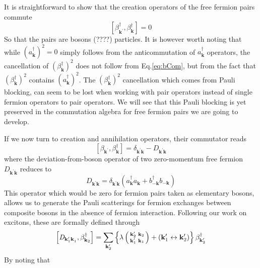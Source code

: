 \documentclass[aps,prb,superscriptaddress,showpacs,reprint,lengthcheck]{revtex4-1}
\newcommand{\vk}{\ensuremath{\mathbf{k}}}
\begin{document}
It is straightforward to show that the creation operators of the free fermion pairs commute 
\begin{equation}  \label{eq:bCom}
\left[\beta^{\dagger}_{\mathbf{k} ^{\prime}},\beta^{\dagger}_{\mathbf{k} }%
\right]  =0
\end{equation}
So that the pairs are bosons (????)  particles.  It is however worth noting that while ${(a^{\dagger}_{\mathbf{k}})} ^2=0$
simply follows from the anticommutation of $a^{\dagger}_{\mathbf{k} }$
operators, the cancellation of ${(\beta^{\dagger}_{\mathbf{k}})} ^2$ does not follow from Eq.\eqref{eq:bCom}, but from the fact that ${(\beta^{\dagger}_{\mathbf{k}})} ^2$  contains ${(a^{\dagger}_{\mathbf{k}})} ^2$. The ${(\beta^{\dagger}_{\mathbf{k}})} ^2$  cancellation which comes from Pauli blocking, can seem to be lost
when working with pair operators instead of  single fermion operators to pair operators. We will see that this Pauli blocking is yet preserved in the commutation algebra for
free fermion pairs we are going to develop.

If we now turn to creation and annihilation operators, their commutator reads
\begin{equation}  \label{eq:betacom}
\left[\beta_{\mathbf{k} ^{\prime}},\beta^{\dagger}_{\mathbf{k} }\right] 
=\delta_{\mathbf{k} ^{\prime}\mathbf{k} }-\mathit{D} _{\mathbf{k} ^{\prime}%
\mathbf{k} }
\end{equation}
where the deviation-from-boson operator of two zero-momentum free fermion $\mathit{D} _{\mathbf{k} ^{\prime}\mathbf{k%
} }$ reduces to 
\begin{equation}  \label{eq:D}
\mathit{D} _{\mathbf{k} ^{\prime}\mathbf{k} }=\delta_{\mathbf{k} ^{\prime}%
\mathbf{k} }\left(a^{\dagger}_{\mathbf{k}}a^{}_{\mathbf{k}
}+b^{\dagger}_{-\mathbf{k} }b^{}_{-\mathbf{k}
}\right) 
\end{equation}
This operator which would be  zero for fermion pairs  taken as
elementary bosons, allows us to generate the Pauli scatterings for fermion
exchanges between composite bosons in the absence of fermion interaction. Following our work on excitons\cite%
{CobosonPhysicsReports}, these are formally defined through 
\begin{equation}
\left[\mathit{D} _{\mathbf{k} ^{\prime}_1\mathbf{k} ^{}_1},\beta^{\dagger}_{%
\mathbf{k} _2}\right]  =\sum_{\mathbf{k} ^{\prime}_2}\left\{\lambda\left(%
\begin{smallmatrix}\vk'_2&\vk_2\\\vk'_1&\vk_1\end{smallmatrix}\right) 
+\left(\mathbf{k} ^{\prime}_1\leftrightarrow\mathbf{k} ^{\prime}_2\right)
\right\} \beta^{\dagger}_{\mathbf{k} ^{\prime}_2}
\end{equation}
By noting that
\end{document}
